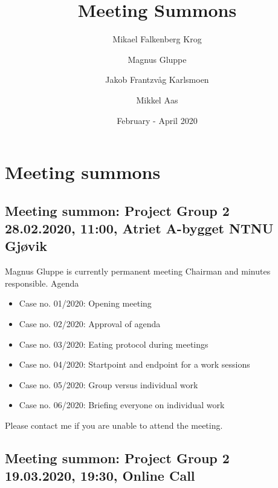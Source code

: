 \documentclass{article}
\title{Meeting Summons}
\author{Mikael Falkenberg Krog \and Magnus Gluppe \and Jakob Frantzvåg Karlsmoen \and Mikkel Aas}
\date{February - April 2020}
\begin{document}
\maketitle
\tableofcontents
\newpage
\section{Meeting summons}
\subsection[Meeting summon: Project Group 2]{Meeting summon: Project Group 2\\ {\large 28.02.2020, 11:00, Atriet A-bygget NTNU Gjøvik}}

Magnus Gluppe is currently permanent meeting Chairman and minutes responsible.
\newline
\newline
\large Agenda 
\begin{itemize}
    \item Case no. 01/2020:  Opening meeting
    \item Case no. 02/2020:  Approval of agenda
    \item Case no. 03/2020:  Eating protocol during meetings
    \item Case no. 04/2020:  Startpoint and endpoint for a work sessions
    \item Case no. 05/2020:  Group versus individual work
    \item Case no. 06/2020:  Briefing everyone on individual work
\end{itemize}
\newline
\newline
Please contact me if you are unable to attend the meeting.

\subsection[Meeting summon: Project Group 2]{Meeting summon: Project Group 2\\ {\large 19.03.2020, 19:30, Online Call}}
\end{document}
